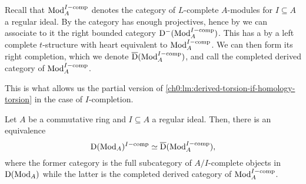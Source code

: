 \begin{construction}
    \label{ch0:const:completed-derived-category}
    Recall that $\mathrm{Mod}_A^{I-\mathrm{comp}}$ denotes the category of $L$-complete $A$-modules for $I\subseteq A$ a regular ideal. By \cite[2.11]{barthel-heard-valenzuela_2020} the category has enough projectives, hence by \cite[1.3.2]{Lurie_HA} we can associate to it the right bounded category $\mathrm{D}^-(\mathrm{Mod}_A^{I-\mathrm{comp}})$. This has a by \cite[1.3.2.19, 1.3.3.16]{Lurie_HA} a left complete $t$-structure with heart equivalent to $\mathrm{Mod}_A^{I-\mathrm{comp}}$. We can then form its right completion, which we denote $\overline{\mathrm{D}}(\mathrm{Mod}_A^{I-\mathrm{comp}})$, and call the completed derived category of $\mathrm{Mod}_A^{I-\mathrm{comp}}$. 
\end{construction}

This is what allows us the partial version of \cref{ch0:lm:derived-torsion-if-homology-torsion} in the case of $I$-completion. 

\begin{proposition}
    \label{ch0:prop:pulling-out-completion}
    Let $A$ be a commutative ring and $I\subseteq A$ a regular ideal. Then, there is an equivalence 
    \[\mathrm{D}(\mathrm{Mod}_A)^{I-\mathrm{comp}}\simeq \overline{\mathrm{D}}(\mathrm{Mod}_A^{I-\mathrm{comp}}),\]
    where the former category is the full subcategory of $A/I$-complete objects in $\mathrm{D}(\mathrm{Mod}_A)$ while the latter is the completed derived category of $\mathrm{Mod}_A^{I-\mathrm{comp}}$. 
\end{proposition}











